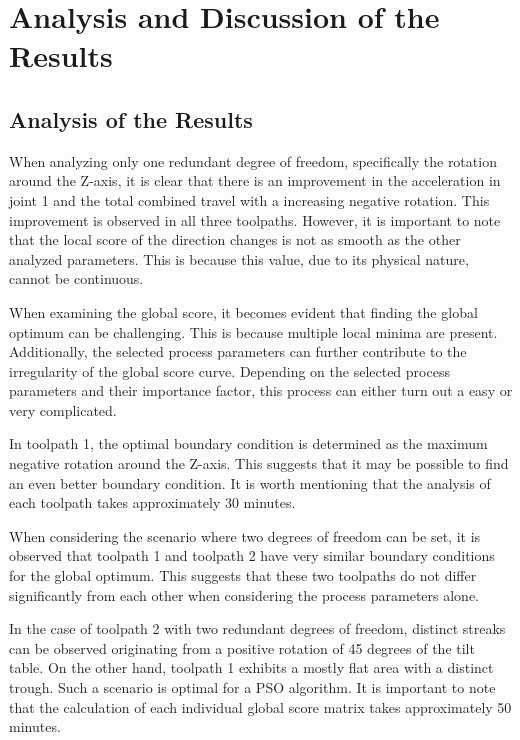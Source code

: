 \newpage
\section{Analysis and Discussion of the Results}%

\subsection{Analysis of the Results}
When analyzing only one redundant degree of freedom, specifically the rotation around the Z-axis, it is clear that there is an improvement in the acceleration in joint 1 and the total combined travel with a increasing negative rotation. This improvement is observed in all three toolpaths. However, it is important to note that the local score of the direction changes is not as smooth as the other analyzed parameters. This is because this value, due to its physical nature, cannot be continuous.

When examining the global score, it becomes evident that finding the global optimum can be challenging. This is because multiple local minima are present. Additionally, the selected process parameters can further contribute to the irregularity of the global score curve.
Depending on the selected process parameters and their importance factor, this process can either turn out a easy or very complicated.

In toolpath 1, the optimal boundary condition is determined as the maximum negative rotation around the Z-axis. This suggests that it may be possible to find an even better boundary condition.
It is worth mentioning that the analysis of each toolpath takes approximately 30 minutes.


When considering the scenario where two degrees of freedom can be set, it is observed that toolpath 1 and toolpath 2 have very similar boundary conditions for the global optimum. This suggests that these two toolpaths do not differ significantly from each other when considering the process parameters alone.

In the case of toolpath 2 with two redundant degrees of freedom, distinct streaks can be observed originating from a positive rotation of 45 degrees of the tilt table.
On the other hand, toolpath 1 exhibits a mostly flat area with a distinct trough. Such a scenario is optimal for a \acrshort{PSO} algorithm.
It is important to note that the calculation of each individual global score matrix takes approximately 50 minutes. 



